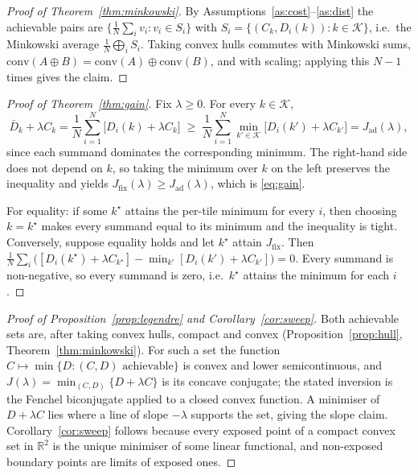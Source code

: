 \documentclass[10pt]{article}
\theoremstyle{plain}
\theoremstyle{definition}
\newcommand{\R}{\mathbb{R}}
\begin{document}
\begin{proof}[Proof of Theorem~\ref{thm:minkowski}]
By Assumptions~\ref{as:cost}--\ref{as:dist} the achievable pairs are
$\bigl\{\frac1N\sum_i v_i : v_i\in S_i\bigr\}$ with
$S_i=\{(C_k,D_i(k)):k\in\mathcal{K}\}$, i.e.\ the Minkowski average
$\frac1N\bigoplus_i S_i$. Taking convex hulls commutes with Minkowski sums,
$\mathrm{conv}(A\oplus B)=\mathrm{conv}(A)\oplus\mathrm{conv}(B)$, and with
scaling; applying this $N-1$ times gives the claim.
\end{proof}

\begin{proof}[Proof of Theorem~\ref{thm:gain}]
Fix $\lambda\ge0$. For every $k\in\mathcal{K}$,
\[
\bar D_k+\lambda C_k
=\frac1N\sum_{i=1}^{N}\bigl[D_i(k)+\lambda C_k\bigr]
\;\ge\;\frac1N\sum_{i=1}^{N}\min_{k'\in\mathcal{K}}
\bigl[D_i(k')+\lambda C_{k'}\bigr]
=J_{\mathrm{ad}}(\lambda),
\]
since each summand dominates the corresponding minimum. The right-hand side
does not depend on $k$, so taking the minimum over $k$ on the left preserves the
inequality and yields $J_{\mathrm{fix}}(\lambda)\ge J_{\mathrm{ad}}(\lambda)$,
which is \eqref{eq:gain}.

For equality: if some $k^\star$ attains the per-tile minimum for every $i$, then
choosing $k=k^\star$ makes every summand equal to its minimum and the inequality
is tight. Conversely, suppose equality holds and let $k^\star$ attain
$J_{\mathrm{fix}}$. Then
$\frac1N\sum_i\bigl([D_i(k^\star)+\lambda C_{k^\star}]-\min_{k'}[D_i(k')+\lambda C_{k'}]\bigr)=0$.
Every summand is non-negative, so every summand is zero, i.e.\ $k^\star$ attains
the minimum for each $i$.
\end{proof}

\begin{proof}[Proof of Proposition~\ref{prop:legendre} and
Corollary~\ref{cor:sweep}]
Both achievable sets are, after taking convex hulls, compact and convex
(Proposition~\ref{prop:hull}, Theorem~\ref{thm:minkowski}). For such a set the
function $C\mapsto\min\{D:(C,D)\text{ achievable}\}$ is convex and lower
semicontinuous, and $J(\lambda)=\min_{(C,D)}\{D+\lambda C\}$ is its concave
conjugate; the stated inversion is the Fenchel biconjugate applied to a closed
convex function. A minimiser of $D+\lambda C$ lies where a line of slope
$-\lambda$ supports the set, giving the slope claim. Corollary~\ref{cor:sweep}
follows because every exposed point of a compact convex set in $\R^2$ is the
unique minimiser of some linear functional, and non-exposed boundary points are
limits of exposed ones.
\end{proof}
\end{document}
